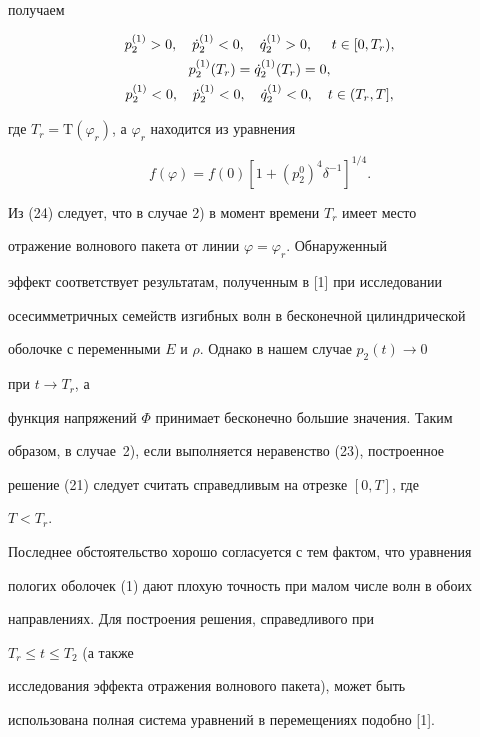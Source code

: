 получаем 


\begin{gather} 


p^{(1)}_2>0,\quad \Dot p^{(1)}_2<0,\quad \Dot q^{(1)}_2>0,\ 


\quad t\in[0,T_r),\notag \\ 


p^{(1)}_2(T_r)=\Dot q^{(1)}_2(T_r)=0,\\ 


p^{(1)}_2<0,\quad \Dot p^{(1)}_2<0,\quad \Dot q^{(1)}_2<0, 


\quad t\in(T_r,T], \notag


\end{gather} 


где $T_r=\mathrm{T}(\varphi_r)$, а $\varphi_r$ находится из уравнения 


$$ 


f(\varphi)=f(0)[1+(p^0_2)^4\delta^{-1}]^{1/4}. 


$$ 


Из (24) следует, что в случае 2) в момент времени $T_r$ имеет место 


отражение волнового пакета от линии $\varphi=\varphi_r$. Обнаруженный 


эффект соответствует результатам, полученным в [1] при исследовании 


осесимметричных семейств изгибных волн в бесконечной цилиндрической 


оболочке с переменными $E$ и $\rho$. Однако в нашем случае $p_2(t)\to 0$ 


при $t\to T_r$, а 


функция напряжений $\Phi$ принимает бесконечно большие значения. Таким 


образом, в случае~2), если выполняется неравенство (23), построенное 


решение (21) следует считать справедливым на отрезке $[0,T]$, где 


$T<T_r$. 


Последнее обстоятельство хорошо согласуется с тем фактом, что уравнения 


пологих оболочек (1) дают плохую точность при малом числе волн в обоих 


направлениях. Для построения решения, справедливого при 


$T_r\le t\le T_2$ (а также 


исследования эффекта отражения волнового пакета), может быть 


использована полная система уравнений в перемещениях подобно [1]. 


